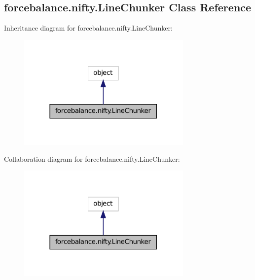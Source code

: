 \hypertarget{classforcebalance_1_1nifty_1_1LineChunker}{\subsection{forcebalance.\-nifty.\-Line\-Chunker Class Reference}
\label{classforcebalance_1_1nifty_1_1LineChunker}
}


Inheritance diagram for forcebalance.\-nifty.\-Line\-Chunker\-:
\nopagebreak
\begin{figure}[H]
\begin{center}
\leavevmode
\includegraphics[width=242pt]{classforcebalance_1_1nifty_1_1LineChunker__inherit__graph}
\end{center}
\end{figure}


Collaboration diagram for forcebalance.\-nifty.\-Line\-Chunker\-:
\nopagebreak
\begin{figure}[H]
\begin{center}
\leavevmode
\includegraphics[width=242pt]{classforcebalance_1_1nifty_1_1LineChunker__coll__graph}
\end{center}
\end{figure}
